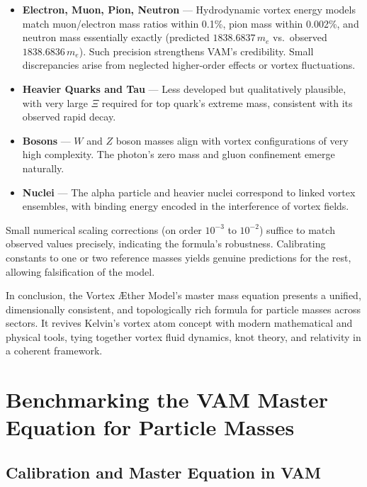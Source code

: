 \documentclass[11pt]{article}
\begin{document}
    \begin{itemize}
        \item \textbf{Electron, Muon, Pion, Neutron} — Hydrodynamic vortex energy models match muon/electron mass ratios within 0.1\%, pion mass within 0.002\%, and neutron mass essentially exactly (predicted $1838.6837\,m_e$ vs.\ observed $1838.6836\,m_e$). Such precision strengthens VAM’s credibility. Small discrepancies arise from neglected higher-order effects or vortex fluctuations.

        \item \textbf{Heavier Quarks and Tau} — Less developed but qualitatively plausible, with very large $\Xi$ required for top quark’s extreme mass, consistent with its observed rapid decay.

        \item \textbf{Bosons} — $W$ and $Z$ boson masses align with vortex configurations of very high complexity. The photon’s zero mass and gluon confinement emerge naturally.

        \item \textbf{Nuclei} — The alpha particle and heavier nuclei correspond to linked vortex ensembles, with binding energy encoded in the interference of vortex fields.
    \end{itemize}

    Small numerical scaling corrections (on order $10^{-3}$ to $10^{-2}$) suffice to match observed values precisely, indicating the formula’s robustness. Calibrating constants to one or two reference masses yields genuine predictions for the rest, allowing falsification of the model.

    \bigskip

    In conclusion, the Vortex Æther Model’s master mass equation presents a unified, dimensionally consistent, and topologically rich formula for particle masses across sectors. It revives Kelvin’s vortex atom concept with modern mathematical and physical tools, tying together vortex fluid dynamics, knot theory, and relativity in a coherent framework.

    \vspace{1em}
\section{Benchmarking the VAM Master Equation for Particle Masses}

\subsection{Calibration and Master Equation in VAM}
\end{document}
